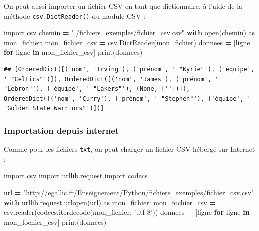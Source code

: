 \documentclass[12pt,]{book}
\newenvironment{Shaded}{\begin{snugshade}}{\end{snugshade}}
\newcommand{\KeywordTok}[1]{\textcolor[rgb]{0.13,0.29,0.53}{\textbf{#1}}}
\newcommand{\StringTok}[1]{\textcolor[rgb]{0.31,0.60,0.02}{#1}}
\newcommand{\ImportTok}[1]{#1}
\newcommand{\ControlFlowTok}[1]{\textcolor[rgb]{0.13,0.29,0.53}{\textbf{#1}}}
\newcommand{\OperatorTok}[1]{\textcolor[rgb]{0.81,0.36,0.00}{\textbf{#1}}}
\newcommand{\BuiltInTok}[1]{#1}
\newcommand{\NormalTok}[1]{#1}
\numberwithin{equation}{section}
\numberwithin{countremarque}{section}
\begin{document}
On peut aussi importer un fichier CSV en tant que dictionnaire, à l'aide
de la méthode \texttt{csv.DictReader()} du module CSV :

\begin{Shaded}
\begin{Highlighting}[]
\ImportTok{import}\NormalTok{ csv}
\NormalTok{chemin }\OperatorTok{=} \StringTok{"./fichiers_exemples/fichier_csv.csv"}
\ControlFlowTok{with} \BuiltInTok{open}\NormalTok{(chemin) }\ImportTok{as}\NormalTok{ mon_fichier:}
\NormalTok{    mon_fichier_csv }\OperatorTok{=}\NormalTok{ csv.DictReader(mon_fichier)}
\NormalTok{    donnees }\OperatorTok{=}\NormalTok{ [ligne }\ControlFlowTok{for}\NormalTok{ ligne }\KeywordTok{in}\NormalTok{ mon_fichier_csv]}
\BuiltInTok{print}\NormalTok{(donnees)}
\end{Highlighting}
\end{Shaded}

\begin{lstlisting}
## [OrderedDict([('nom', 'Irving'), ('prénom', ' "Kyrie"'), ('équipe', ' "Celtics"')]), OrderedDict([('nom', 'James'), ('prénom', ' "Lebron"'), ('équipe', ' "Lakers"'), (None, [''])]), OrderedDict([('nom', 'Curry'), ('prénom', ' "Stephen"'), ('équipe', ' "Golden State Warriors"')])]
\end{lstlisting}

\subsubsection{Importation depuis
internet}\label{importation-depuis-internet-1}

Comme pour les fichiers \texttt{txt}, on peut charger un fichier CSV
hébergé sur Internet :

\begin{Shaded}
\begin{Highlighting}[]
\ImportTok{import}\NormalTok{ csv}
\ImportTok{import}\NormalTok{ urllib.request}
\ImportTok{import}\NormalTok{ codecs}

\NormalTok{url }\OperatorTok{=} \StringTok{"http://egallic.fr/Enseignement/Python/fichiers_exemples/fichier_csv.csv"}
\ControlFlowTok{with}\NormalTok{ urllib.request.urlopen(url) }\ImportTok{as}\NormalTok{ mon_fichier:}
\NormalTok{    mon_fochier_csv }\OperatorTok{=}\NormalTok{ csv.reader(codecs.iterdecode(mon_fichier, }\StringTok{'utf-8'}\NormalTok{))}
\NormalTok{    donnees }\OperatorTok{=}\NormalTok{ [ligne }\ControlFlowTok{for}\NormalTok{ ligne }\KeywordTok{in}\NormalTok{ mon_fochier_csv]}
\BuiltInTok{print}\NormalTok{(donnees)}
\end{Highlighting}
\end{Shaded}
\end{document}
